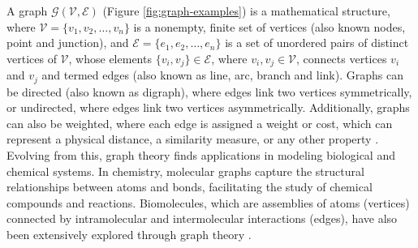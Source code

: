 \documentclass[Ingles]{phdthesis}
\begin{document}
A graph $\mathcal{G(V,E)}$ (Figure \ref{fig:graph-examples}) is a mathematical structure, where $\mathcal{V} = \{v_1, v_2, \dots, v_n\}$ is a nonempty, finite set of vertices (also known nodes, point and junction), and $\mathcal{E} = \{e_1, e_2, \dots, e_n\}$ is a set of unordered pairs of distinct vertices of $\mathcal{V}$, whose elements $\{v_i,v_j\} \in \mathcal{E}$, where $v_i,v_j \in \mathcal{V}$, connects vertices $v_i$ and $v_j$ and termed edges (also known as line, arc, branch and link). Graphs can be directed (also known as digraph), where edges link two vertices symmetrically, or undirected, where edges link two vertices asymmetrically. Additionally, graphs can also be weighted, where each edge is assigned a weight or cost, which can represent a physical distance, a similarity measure, or any other property \cite{foulds1995,bondy1976,majeed2020,black2020}. Evolving from this, graph theory finds applications in modeling biological and chemical systems. In chemistry, molecular graphs capture the structural relationships between atoms and bonds, facilitating the study of chemical compounds and reactions. Biomolecules, which are assemblies of atoms (vertices) connected by intramolecular and intermolecular interactions (edges), have also been extensively explored through graph theory \cite{vishveshwara2002,mason2007}.
\end{document}
